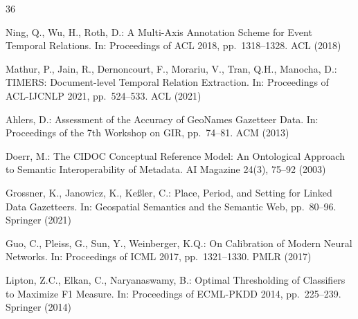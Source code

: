 \documentclass[11pt,a4paper]{article}
\begin{document}
\begin{thebibliography}{36}

Ning, Q., Wu, H., Roth, D.:
A Multi-Axis Annotation Scheme for Event Temporal Relations.
In: Proceedings of ACL 2018, pp.~1318--1328. ACL (2018)

Mathur, P., Jain, R., Dernoncourt, F., Morariu, V., Tran, Q.H., Manocha, D.:
TIMERS: Document-level Temporal Relation Extraction.
In: Proceedings of ACL-IJCNLP 2021, pp.~524--533. ACL (2021)


Ahlers, D.:
Assessment of the Accuracy of GeoNames Gazetteer Data.
In: Proceedings of the 7th Workshop on GIR, pp.~74--81. ACM (2013)

Doerr, M.:
The CIDOC Conceptual Reference Model: An Ontological Approach to Semantic Interoperability of Metadata.
AI Magazine 24(3), 75--92 (2003)

Grossner, K., Janowicz, K., Ke{\ss}ler, C.:
Place, Period, and Setting for Linked Data Gazetteers.
In: Geospatial Semantics and the Semantic Web, pp.~80--96. Springer (2021)


Guo, C., Pleiss, G., Sun, Y., Weinberger, K.Q.:
On Calibration of Modern Neural Networks.
In: Proceedings of ICML 2017, pp.~1321--1330. PMLR (2017)

Lipton, Z.C., Elkan, C., Naryanaswamy, B.:
Optimal Thresholding of Classifiers to Maximize F1 Measure.
In: Proceedings of ECML-PKDD 2014, pp.~225--239. Springer (2014)

\end{thebibliography}
\end{document}
